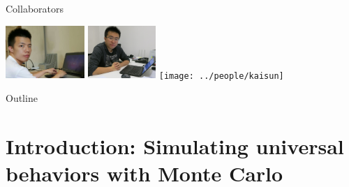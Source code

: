 \documentclass[xcolor=table, 10pt, aspectratio=43]{beamer}
\begin{document}
\begin{frame}{Collaborators}
\begin{center}
   \includegraphics[height=2cm]{../people/zihongliu}
	\includegraphics[height=2cm]{../people/ziyangmeng}
	\texttt{[image: ../people/kaisun]}
\end{center}
\end{frame}

\begin{frame}{Outline}
		\tableofcontents
\end{frame}

\section{Introduction: Simulating universal behaviors with Monte Carlo}
\end{document}
